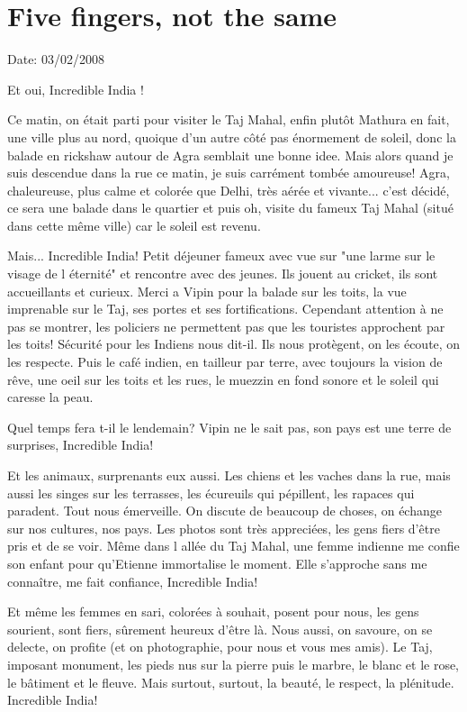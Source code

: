 \section{Five fingers, not the same}

Date: 03/02/2008

\begin{multicols}{2}

Et oui, Incredible India !

Ce matin, on était parti pour visiter le Taj Mahal, enfin plutôt Mathura en fait, une ville plus au nord, quoique d'un autre côté pas énormement de soleil, donc la balade en rickshaw autour de Agra semblait une bonne idee. Mais alors quand je suis descendue dans la rue ce matin, je suis carrément tombée amoureuse! Agra, chaleureuse, plus calme et colorée que Delhi, très aérée et vivante... c'est décidé, ce sera une balade dans le quartier et puis oh, visite du fameux Taj Mahal (situé dans cette même ville) car le soleil est revenu.

Mais... Incredible India! Petit déjeuner fameux avec vue sur "une larme sur le visage de l éternité" et rencontre avec des jeunes. Ils jouent au cricket, ils sont accueillants et curieux. Merci a Vipin pour la balade sur les toits, la vue imprenable sur le Taj, ses portes et ses fortifications. Cependant attention à ne pas se montrer, les policiers ne permettent pas que les touristes approchent par les toits! Sécurité pour les Indiens nous dit-il. Ils nous protègent, on les écoute, on les respecte. Puis le café indien, en tailleur par terre, avec toujours la vision de rêve, une oeil sur les toits et les rues, le muezzin en fond sonore et le soleil qui caresse la peau.

Quel temps fera t-il le lendemain? Vipin ne le sait pas, son pays est une terre de surprises, Incredible India!

Et les animaux, surprenants eux aussi. Les chiens et les vaches dans la rue, mais aussi les singes sur les terrasses, les écureuils qui pépillent, les rapaces qui paradent. Tout nous émerveille. On discute de beaucoup de choses, on échange sur nos cultures, nos pays. Les photos sont très appreciées, les gens fiers d'être pris et de se voir. Même dans l allée du Taj Mahal, une femme indienne me confie son enfant pour qu'Etienne immortalise le moment. Elle s'approche sans me connaître, me fait confiance, Incredible India!

Et même les femmes en sari, colorées à souhait, posent pour nous, les gens sourient, sont fiers, sûrement heureux d'être là. Nous aussi, on savoure, on se delecte, on profite (et on photographie, pour nous et vous mes amis). Le Taj, imposant monument, les pieds nus sur la pierre puis le marbre, le blanc et le rose, le bâtiment et le fleuve. Mais surtout, surtout, la beauté, le respect, la plénitude. Incredible India!


\end{multicols}
